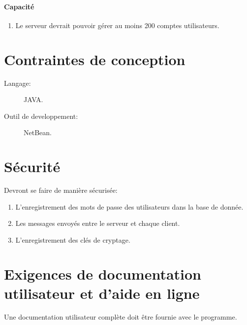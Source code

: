\documentclass[10pt,a4paper]{report}
\begin{document}
\paragraph{Capacité}

 	\begin{enumerate}
 		\item Le serveur devrait pouvoir gérer au moins 200 comptes utilisateurs.
 	\end{enumerate}


\section{Contraintes de conception}
\begin{description}
\item[Langage:] JAVA.
\item[Outil de developpement:] NetBean.
\end{description}


\section{Sécurité}
Devront se faire de manière sécurisée:
\begin{enumerate}
\item L'enregistrement des mots de passe des utilisateurs dans la base de donnée.
\item Les messages envoyés entre le serveur et chaque client.
\item L'enregistrement des clés de cryptage.
\end{enumerate}


\section{Exigences de documentation utilisateur et d’aide en ligne}
Une documentation utilisateur complète doit être fournie avec le programme.
\end{document}
